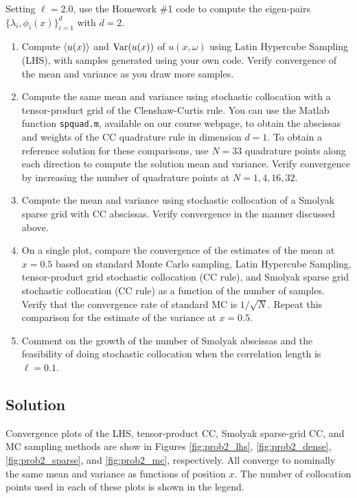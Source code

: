 \documentclass[11pt]{article}
\begin{document}
Setting $\ell = 2.0$, use the Homework \#1 code to compute the eigen-pairs $\{ \lambda_i, \phi_i(x) \}_{i=1}^d$ with $d=2$.

\begin{enumerate}

\item Compute $\left\langle u(x) \right\rangle$ and $\operatorname{Var}(u(x))$ of $u(x,\omega)$ using Latin Hypercube Sampling (LHS), with samples generated using your own code. Verify convergence of the mean and variance as you draw more samples.

\item Compute the same mean and variance using stochastic collocation with a tensor-product grid of the Clenshaw-Curtis rule. You can use the Matlab function \lstinline|spquad.m|, available on our course webpage, to obtain the abscissas and weights of the CC quadrature rule in dimension $d=1$. To obtain a reference solution for these comparisons, use $N=33$ quadrature points along each direction to compute the solution mean and variance. Verify convergence by increasing the number of quadrature points at $N = 1, 4, 16, 32$.

\item Compute the mean and variance using stochastic collocation of a Smolyak sparse grid with CC abscissas. Verify convergence in the manner discussed above.

\item On a single plot, compare the convergence of the estimates of the mean at $x=0.5$ based on standard Monte Carlo sampling, Latin Hypercube Sampling, tensor-product grid stochastic collocation (CC rule), and Smolyak sparse grid stochastic collocation (CC rule) as a function of the number of samples. Verify that the convergence rate of standard MC is $1/\sqrt{N}$. Repeat this comparison for the estimate of the variance at $x=0.5$.

\item Comment on the growth of the number of Smolyak abscissas and the feasibility of doing stochastic collocation when the correlation length is $\ell = 0.1$.

\end{enumerate}

\subsection*{Solution}

Convergence plots of the LHS, tensor-product CC, Smolyak sparse-grid CC, and MC sampling methods are show in Figures \ref{fig:prob2_lhs}, \ref{fig:prob2_dense}, \ref{fig:prob2_sparse}, and \ref{fig:prob2_mc}, respectively. All converge to nominally the same mean and variance as functions of position $x$. The number of collocation points used in each of these plots is shown in the legend.
\end{document}
